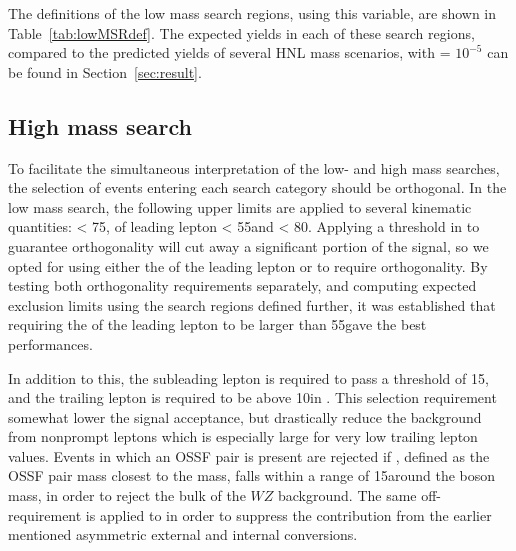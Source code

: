 The definitions of the low mass
search regions, using this variable, are shown in
Table~\ref{tab:lowMSRdef}. The expected yields in each of these search
regions, compared to the predicted yields of several HNL mass
scenarios, with \mixpar = $10^{-5}$ can be found in Section~\ref{sec:result}.  

\begin{table}[tbh]
\centering
\caption{Search regions in the low mass category.}
\label{tab:lowMSRdef}
\end{table}



\subsection{High mass search}
To facilitate the simultaneous interpretation of the low- and high mass searches, the selection of events entering each search category should be orthogonal. In the low mass search, the following upper limits are applied to several kinematic quantities: 
\ptmiss < 75\GeV, \pt of leading lepton < 55\GeV and \mlll<
80\GeV. Applying a threshold in \ptmiss to guarantee orthogonality will
cut away a significant portion of the signal, so we opted for using
either the \pt of the leading lepton or \mlll to require
orthogonality. By testing both
orthogonality requirements separately, and computing expected
exclusion limits using the search regions defined further,
 it was established that requiring the \pt of the leading lepton to be
 larger than 55\GeV gave the best performances.
 
In addition to this, the subleading lepton is
 required to pass a \pt threshold of 15\GeV, and the trailing lepton
 is required to be above 10\GeV in \pt .
 This selection requirement somewhat lower the signal acceptance, but drastically
 reduce the background from nonprompt leptons which is especially large for
 very low trailing lepton \pt values. Events in which an OSSF pair is
 present are rejected if \Mll, defined as the OSSF pair mass closest
 to the \PZ mass, falls within a range of 15\GeV around the \PZ boson
 mass, in order to reject the bulk of the $WZ$ background.
 The same off-\PZ requirement is applied to \mlll in order to suppress
 the contribution from the earlier mentioned asymmetric external and
 internal conversions.

